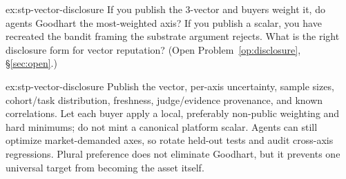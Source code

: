 \documentclass[11pt,a4paper]{article}
\theoremstyle{definition}
\begin{document}
\begin{pdexercise}[kind=Open,rating=3]{ex:stp-vector-disclosure}
If you publish the 3-vector and buyers weight it, do agents Goodhart the
most-weighted axis? If you publish a scalar, you have recreated the bandit
framing the substrate argument rejects. What is the right disclosure form for
vector reputation? (Open Problem~\ref{op:disclosure}, \S\ref{sec:open}.)
\end{pdexercise}
\begin{pdsolution}{ex:stp-vector-disclosure}
Publish the vector, per-axis uncertainty, sample sizes, cohort/task
distribution, freshness, judge/evidence provenance, and known correlations.
Let each buyer apply a local, preferably non-public weighting and hard
minimums; do not mint a canonical platform scalar. Agents can still optimize
market-demanded axes, so rotate held-out tests and audit cross-axis
regressions. Plural preference does not eliminate Goodhart, but it prevents
one universal target from becoming the asset itself.
\end{pdsolution}

\end{document}
